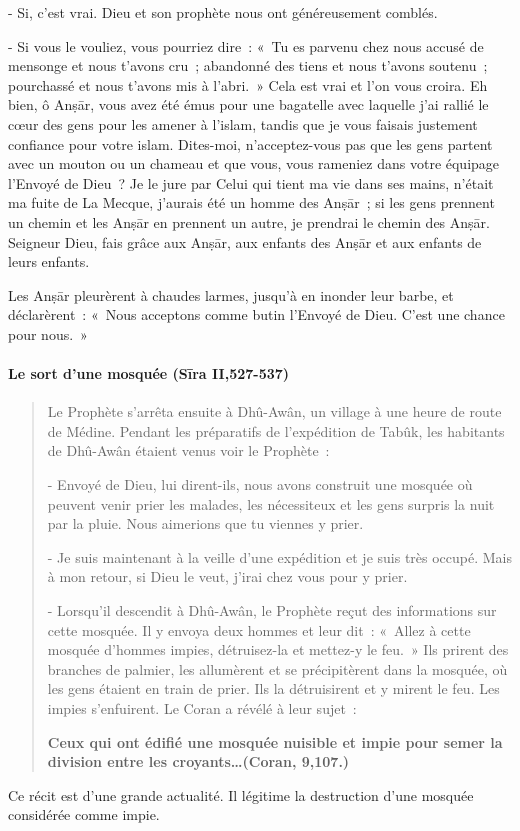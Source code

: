 {- Si, c'est vrai. Dieu et son prophète nous ont généreusement
comblés.}

{- Si vous le vouliez, vous pourriez dire~: «~Tu es parvenu chez
nous accusé de mensonge et nous t'avons cru~; abandonné des tiens et
nous t'avons soutenu~; pourchassé et nous t'avons mis à l'abri.~» Cela
est vrai et l'on vous croira. Eh bien, ô Anṣār, vous avez été émus pour
une bagatelle avec laquelle j'ai rallié le cœur des gens pour les amener
à l'islam, tandis que je vous faisais justement confiance pour votre
islam. Dites-moi, n'acceptez-vous pas que les gens partent avec un
mouton ou un chameau et que vous, vous rameniez dans votre équipage
l'Envoyé de Dieu~? Je le jure par Celui qui tient ma vie dans ses mains,
n'était ma fuite de La Mecque, j'aurais été un homme des Anṣār~; si les
gens prennent un chemin et les Anṣār en prennent un autre, je prendrai
le chemin des Anṣār. Seigneur Dieu, fais grâce aux Anṣār, aux enfants
des Anṣār et aux enfants de leurs enfants.}

{Les Anṣār pleurèrent à chaudes larmes, jusqu'à en inonder leur
barbe, et déclarèrent~: «~Nous acceptons comme butin l'Envoyé de Dieu.
C'est une chance pour nous.~»}

\paragraph{Le sort d'une mosquée (Sīra II,527-537)}
\begin{quote}
{Le Prophète s'arrêta ensuite à Dhû-Awân, un village à une heure de
route de Médine. Pendant les préparatifs de l'expédition de Tabûk, les
habitants de Dhû-Awân étaient venus voir le Prophète~:}

{- Envoyé de Dieu, lui dirent-ils, nous avons construit une mosquée
où peuvent venir prier les malades, les nécessiteux et les gens surpris
la nuit par la pluie. Nous aimerions que tu viennes y prier.}

{- Je suis maintenant à la veille d'une expédition et je suis très
occupé. Mais à mon retour, si Dieu le veut, j'irai chez vous pour y
prier.}

{- Lorsqu'il descendit à Dhû-Awân, le Prophète reçut des
informations sur cette mosquée. Il y envoya deux hommes et leur dit~:
«~Allez à cette mosquée d'hommes impies, détruisez-la et mettez-y le
feu.~» Ils prirent des branches de palmier, les allumèrent et se
précipitèrent dans la mosquée, où les gens étaient en train de prier.
Ils la détruisirent et y mirent le feu. Les impies s'enfuirent. Le Coran
a révélé à leur sujet~:}

{\textbf{Ceux qui ont édifié une mosquée nuisible et impie pour
semer la division entre les croyants\ldots(Coran, 9,107.)}}
    
\end{quote}
Ce récit est d'une grande actualité. Il légitime la destruction d'une
mosquée considérée comme impie.

